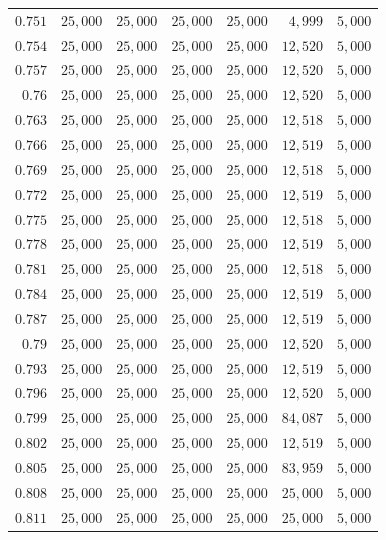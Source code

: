\begin{singlespace}
\begin{longtable}{@{}rrrrrrr@{}}
$0.751$ & $25{,}000$ & $25{,}000$ & $25{,}000$ & $25{,}000$ & $4{,}999$ & $5{,}000$ \\
$0.754$ & $25{,}000$ & $25{,}000$ & $25{,}000$ & $25{,}000$ & $12{,}520$ & $5{,}000$ \\
$0.757$ & $25{,}000$ & $25{,}000$ & $25{,}000$ & $25{,}000$ & $12{,}520$ & $5{,}000$ \\
$0.76$ & $25{,}000$ & $25{,}000$ & $25{,}000$ & $25{,}000$ & $12{,}520$ & $5{,}000$ \\
$0.763$ & $25{,}000$ & $25{,}000$ & $25{,}000$ & $25{,}000$ & $12{,}518$ & $5{,}000$ \\
$0.766$ & $25{,}000$ & $25{,}000$ & $25{,}000$ & $25{,}000$ & $12{,}519$ & $5{,}000$ \\
$0.769$ & $25{,}000$ & $25{,}000$ & $25{,}000$ & $25{,}000$ & $12{,}518$ & $5{,}000$ \\
$0.772$ & $25{,}000$ & $25{,}000$ & $25{,}000$ & $25{,}000$ & $12{,}519$ & $5{,}000$ \\
$0.775$ & $25{,}000$ & $25{,}000$ & $25{,}000$ & $25{,}000$ & $12{,}518$ & $5{,}000$ \\
$0.778$ & $25{,}000$ & $25{,}000$ & $25{,}000$ & $25{,}000$ & $12{,}519$ & $5{,}000$ \\
$0.781$ & $25{,}000$ & $25{,}000$ & $25{,}000$ & $25{,}000$ & $12{,}518$ & $5{,}000$ \\
$0.784$ & $25{,}000$ & $25{,}000$ & $25{,}000$ & $25{,}000$ & $12{,}519$ & $5{,}000$ \\
$0.787$ & $25{,}000$ & $25{,}000$ & $25{,}000$ & $25{,}000$ & $12{,}519$ & $5{,}000$ \\
$0.79$ & $25{,}000$ & $25{,}000$ & $25{,}000$ & $25{,}000$ & $12{,}520$ & $5{,}000$ \\
$0.793$ & $25{,}000$ & $25{,}000$ & $25{,}000$ & $25{,}000$ & $12{,}519$ & $5{,}000$ \\
$0.796$ & $25{,}000$ & $25{,}000$ & $25{,}000$ & $25{,}000$ & $12{,}520$ & $5{,}000$ \\
$0.799$ & $25{,}000$ & $25{,}000$ & $25{,}000$ & $25{,}000$ & $84{,}087$ & $5{,}000$ \\
$0.802$ & $25{,}000$ & $25{,}000$ & $25{,}000$ & $25{,}000$ & $12{,}519$ & $5{,}000$ \\
$0.805$ & $25{,}000$ & $25{,}000$ & $25{,}000$ & $25{,}000$ & $83{,}959$ & $5{,}000$ \\
$0.808$ & $25{,}000$ & $25{,}000$ & $25{,}000$ & $25{,}000$ & $25{,}000$ & $5{,}000$ \\
$0.811$ & $25{,}000$ & $25{,}000$ & $25{,}000$ & $25{,}000$ & $25{,}000$ & $5{,}000$ \\

\end{longtable}
\end{singlespace}

